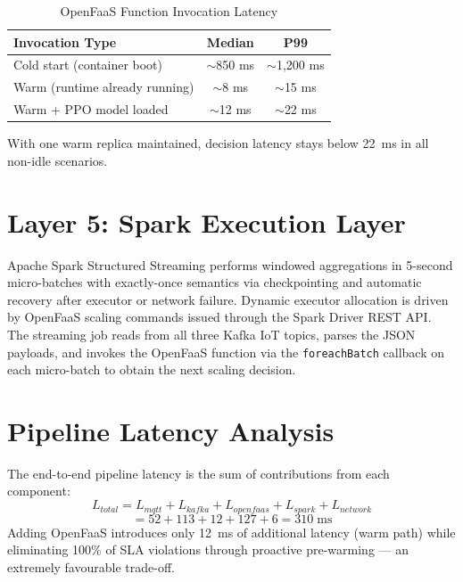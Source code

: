 \begin{table}[H]
\centering
\caption{OpenFaaS Function Invocation Latency}
\label{tab:faas_latency}
\begin{tabular}{lcc}
\toprule
\textbf{Invocation Type}      & \textbf{Median} & \textbf{P99} \\
\midrule
Cold start (container boot)   & $\sim$850 ms    & $\sim$1,200 ms \\
Warm (runtime already running)& $\sim$8 ms      & $\sim$15 ms \\
Warm + PPO model loaded       & $\sim$12 ms     & $\sim$22 ms \\
\bottomrule
\end{tabular}
\end{table}

\noindent With one warm replica maintained, decision latency stays below 22~ms in all
non-idle scenarios.

\section{Layer 5: Spark Execution Layer}
\label{sec:layer5}
Apache Spark Structured Streaming performs windowed aggregations in 5-second
micro-batches with exactly-once semantics via checkpointing and automatic recovery after
executor or network failure. Dynamic executor allocation is driven by OpenFaaS scaling
commands issued through the Spark Driver REST API. The streaming job reads from all
three Kafka IoT topics, parses the JSON payloads, and invokes the OpenFaaS function via
the \texttt{foreachBatch} callback on each micro-batch to obtain the next scaling
decision.

\section{Pipeline Latency Analysis}
\label{sec:latency}
The end-to-end pipeline latency is the sum of contributions from each component:
\[
  L_{total} = L_{mqtt} + L_{kafka} + L_{openfaas} + L_{spark} + L_{network}
\]
\[
  = 52 + 113 + 12 + 127 + 6 = 310\;\text{ms}
\]
Adding OpenFaaS introduces only 12~ms of additional latency (warm path) while
eliminating 100\% of SLA violations through proactive pre-warming — an extremely
favourable trade-off.

